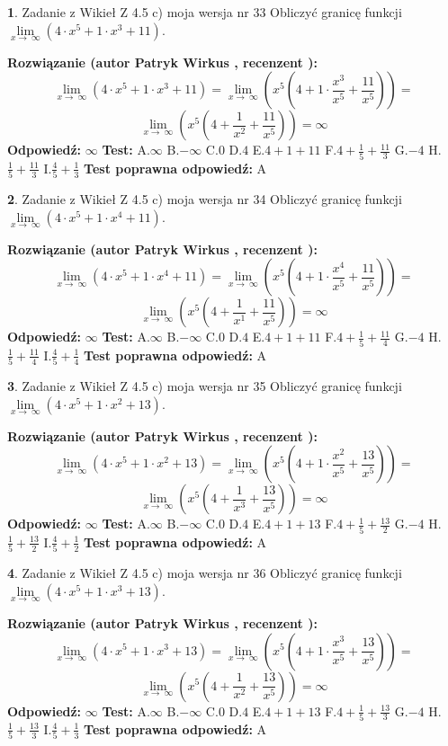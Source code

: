 \documentclass[12pt, a4paper]{article}
\theoremstyle{definition} %
\newtheorem{zad}{}
\newcommand{\zadStart}[1]{\begin{zad}#1\newline}
\newcommand{\zadStop}{\end{zad}}
\newcommand{\rozwStart}[2]{\noindent \textbf{Rozwiązanie (autor #1 , recenzent #2): }\newline}
\newcommand{\rozwStop}{\newline}
\newcommand{\odpStart}{\noindent \textbf{Odpowiedź:}\newline}
\newcommand{\odpStop}{\newline}
\newcommand{\testStart}{\noindent \textbf{Test:}\newline}
\newcommand{\testStop}{\newline}
\newcommand{\kluczStart}{\noindent \textbf{Test poprawna odpowiedź:}\newline}
\newcommand{\kluczStop}{\newline}
\begin{document}
\zadStart{Zadanie z Wikieł Z 4.5 c) moja wersja nr 33}
Obliczyć granicę funkcji  $\lim\limits_{x\to\ \infty}(4 \cdot x^{5}+1 \cdot x^{3}+11)$.
\zadStop
\rozwStart{Patryk Wirkus}{}
$$\lim\limits_{x\to\ \infty}(4 \cdot x^{5}+1 \cdot x^{3}+11) = \lim\limits_{x\to\ \infty}(x^{5}(4 +1 \cdot \frac{x^{3}}{x^{5}}+\frac{11}{x^{5}})) =$$ $$\lim\limits_{x\to\ \infty}(x^{5}(4 +\frac{1}{x^{2}}+\frac{11}{x^{5}})) =\infty$$
\rozwStop
\odpStart
$\infty$
\odpStop
\testStart
A.$\infty$ B.$-\infty$ C.$0$ D.$4$ E.$4 + 1 + 11$
F.$4+\frac{1}{5}+\frac{11}{3}$ G.$-4$
H.$\frac{1}{5}+\frac{11}{3}$
I.$\frac{4}{5}+\frac{1}{3}$
\testStop
\kluczStart
A
\kluczStop



\zadStart{Zadanie z Wikieł Z 4.5 c) moja wersja nr 34}
Obliczyć granicę funkcji  $\lim\limits_{x\to\ \infty}(4 \cdot x^{5}+1 \cdot x^{4}+11)$.
\zadStop
\rozwStart{Patryk Wirkus}{}
$$\lim\limits_{x\to\ \infty}(4 \cdot x^{5}+1 \cdot x^{4}+11) = \lim\limits_{x\to\ \infty}(x^{5}(4 +1 \cdot \frac{x^{4}}{x^{5}}+\frac{11}{x^{5}})) =$$ $$\lim\limits_{x\to\ \infty}(x^{5}(4 +\frac{1}{x^{1}}+\frac{11}{x^{5}})) =\infty$$
\rozwStop
\odpStart
$\infty$
\odpStop
\testStart
A.$\infty$ B.$-\infty$ C.$0$ D.$4$ E.$4 + 1 + 11$
F.$4+\frac{1}{5}+\frac{11}{4}$ G.$-4$
H.$\frac{1}{5}+\frac{11}{4}$
I.$\frac{4}{5}+\frac{1}{4}$
\testStop
\kluczStart
A
\kluczStop



\zadStart{Zadanie z Wikieł Z 4.5 c) moja wersja nr 35}
Obliczyć granicę funkcji  $\lim\limits_{x\to\ \infty}(4 \cdot x^{5}+1 \cdot x^{2}+13)$.
\zadStop
\rozwStart{Patryk Wirkus}{}
$$\lim\limits_{x\to\ \infty}(4 \cdot x^{5}+1 \cdot x^{2}+13) = \lim\limits_{x\to\ \infty}(x^{5}(4 +1 \cdot \frac{x^{2}}{x^{5}}+\frac{13}{x^{5}})) =$$ $$\lim\limits_{x\to\ \infty}(x^{5}(4 +\frac{1}{x^{3}}+\frac{13}{x^{5}})) =\infty$$
\rozwStop
\odpStart
$\infty$
\odpStop
\testStart
A.$\infty$ B.$-\infty$ C.$0$ D.$4$ E.$4 + 1 + 13$
F.$4+\frac{1}{5}+\frac{13}{2}$ G.$-4$
H.$\frac{1}{5}+\frac{13}{2}$
I.$\frac{4}{5}+\frac{1}{2}$
\testStop
\kluczStart
A
\kluczStop



\zadStart{Zadanie z Wikieł Z 4.5 c) moja wersja nr 36}
Obliczyć granicę funkcji  $\lim\limits_{x\to\ \infty}(4 \cdot x^{5}+1 \cdot x^{3}+13)$.
\zadStop
\rozwStart{Patryk Wirkus}{}
$$\lim\limits_{x\to\ \infty}(4 \cdot x^{5}+1 \cdot x^{3}+13) = \lim\limits_{x\to\ \infty}(x^{5}(4 +1 \cdot \frac{x^{3}}{x^{5}}+\frac{13}{x^{5}})) =$$ $$\lim\limits_{x\to\ \infty}(x^{5}(4 +\frac{1}{x^{2}}+\frac{13}{x^{5}})) =\infty$$
\rozwStop
\odpStart
$\infty$
\odpStop
\testStart
A.$\infty$ B.$-\infty$ C.$0$ D.$4$ E.$4 + 1 + 13$
F.$4+\frac{1}{5}+\frac{13}{3}$ G.$-4$
H.$\frac{1}{5}+\frac{13}{3}$
I.$\frac{4}{5}+\frac{1}{3}$
\testStop
\kluczStart
A
\kluczStop
\end{document}
